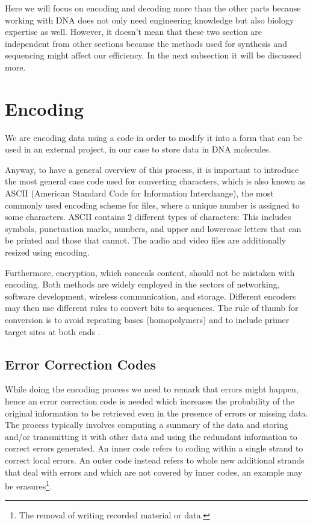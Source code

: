 \documentclass[10pt,twocolumn,twoside]{gsajnl}
\theoremstyle{definition}
\begin{document}
Here we will focus on encoding and decoding more than the other parts because working with DNA does not only need engineering knowledge but also biology expertise as well. However, it doesn't mean that these two section are independent from other sections because the methods used for synthesis and sequencing might affect our efficiency. In the next subsection it will be discussed more.

\section{Encoding}
\label{sec: Encoding}
We are encoding data using a code in order to modify it into a form that can be used in an external project, in our case to store data in DNA molecules.

Anyway, to have a general overview of this process, it is important to introduce the most general case code used for converting characters, which is also known as ASCII (American Standard Code for Information Interchange), the most commonly used encoding scheme for files, where a unique number is assigned to some characters. ASCII contains 2 different types of characters: This includes symbols, punctuation marks, numbers, and upper and lowercase letters that can be printed and those that cannot.
The audio and video files are additionally resized using encoding.

Furthermore, encryption, which conceals content, should not be mistaken with encoding. Both methods are widely employed in the sectors of networking, software development, wireless communication, and storage. Different encoders may then use different rules to convert bits to sequences. The rule of thumb for conversion is to avoid repeating bases (homopolymers) and to include primer target sites at both ends \cite{technopedia2021}.

\subsection{Error Correction Codes}
While doing the encoding process we need to remark that errors might happen, hence an error correction code is needed which increases the probability of the original information to be retrieved even in the presence of errors or missing data. The process typically involves computing a summary of the data and storing and/or transmitting it with other data and using the redundant information to correct errors generated. An inner code refers to coding within a single strand to correct local errors. An outer code instead refers to whole new additional strands that deal with errors and which are not covered by inner codes, an example may be erasures\footnote{The removal of writing recorded material or data.}.
\end{document}
